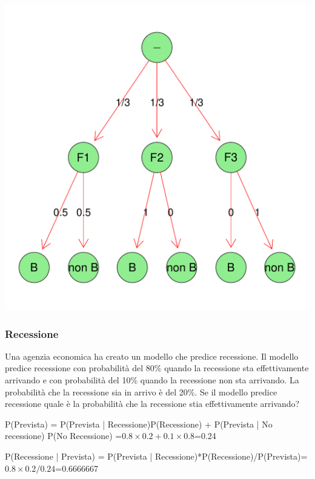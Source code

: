 \documentclass[onecolumn,12pt]{book}\usepackage[]{graphicx}\usepackage[]{color}
\makeatletter
\def\maxwidth{ %
  \ifdim\Gin@nat@width>\linewidth
    \linewidth
  \else
    \Gin@nat@width
  \fi
}
\newenvironment{knitrout}{}{} %
\makeatother
\begin{document}
\begin{knitrout}
\color{fgcolor}
\includegraphics[width=\maxwidth]{figure/unnamed-chunk-28-1} 

\end{knitrout}


\subsubsection{Recessione}

Una agenzia economica ha creato un modello che predice recessione. Il modello predice recessione con probabilità del 80\% quando  la recessione sta effettivamente arrivando e con probabilità del 10\% quando la recessione non sta arrivando. La probabilità che la recessione sia in arrivo è del 20\%. Se il modello predice recessione quale è la probabilità che la recessione stia effettivamente arrivando?

P(Prevista) = P(Prevista | Recessione)P(Recessione) + P(Prevista | No recessione) P(No Recessione) =$0.8\times 0.2 + 0.1\times 0.8$=0.24



P(Recessione | Prevista) = P(Prevista | Recessione)*P(Recessione)/P(Prevista)=$0.8\times 0.2/0.24$=0.6666667
\end{document}
